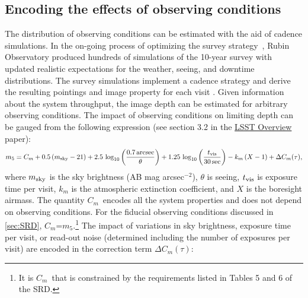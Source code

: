 \documentclass[PST,authoryear,toc]{lsstdoc}
\newcommand{\cm}{\ensuremath{C_m}}
\newcommand{\mf}{\ensuremath{m_5}}
\begin{document}
\subsection{Encoding the effects of observing conditions}\label{sec:Cm}

The distribution of observing conditions can be estimated with the aid of cadence simulations.  In the on-going process of optimizing the survey strategy~\citep{Bianco_2021}, Rubin Observatory produced hundreds of simulations of the 10-year survey with updated realistic expectations for the weather, seeing, and downtime distributions.  The survey simulations implement a cadence strategy and derive the resulting pointings and image property for each visit \citep{2019AJ....157..151N, 2016SPIE.9910E..13D, 2014SPIE.9150E..15D}.
Given information about the system throughput, the image depth can be estimated for arbitrary observing conditions. The impact of observing conditions on limiting depth
can be gauged from the following expression (see section 3.2 in the
\href{https://ls.st/lop}{{LSST Overview}} paper):
\begin{equation}
\label{eq:Cm}
m_5 = \cm + 0.5\,(m_{\rm sky} - 21) + 2.5\,\log_{10}\left(\frac{0.7 \, {\rm arcsec}}{\theta}\right) + 1.25\,\log_{10}\left(\frac{t_{\rm vis}}{ 30 \, {\rm sec}}\right) - k_m\,(X-1) + \Delta\cm(\tau),
\end{equation}
where $m_{\rm sky}$ is the sky brightness (AB mag arcsec$^{-2}$), $\theta$ is seeing, $t_{\rm vis}$ is exposure
time per visit, $k_m$ is the atmospheric extinction coefficient, and $X$ is the boresight airmass.
The quantity \cm\ encodes all the system properties and does not depend on observing conditions.  For the fiducial observing conditions discussed in \autoref{sec:SRD}, \cm=\mf.\footnote{It is \cm\ that is constrained by the requirements listed in Tables 5 and 6 of the SRD.}
The impact of variations in sky brightness, exposure time per visit, or read-out noise (determined including the number
of exposures per visit) are encoded in the correction term $\Delta C_m(\tau)$:
\end{document}

